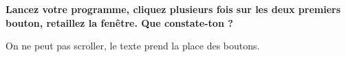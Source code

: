 {\bfseries Lancez votre programme, cliquez plusieurs fois sur les deux premiers bouton, retaillez la fenêtre. Que constate-\/t\textquotesingle{}on ?}

On ne peut pas scroller, le texte prend la place des boutons. 